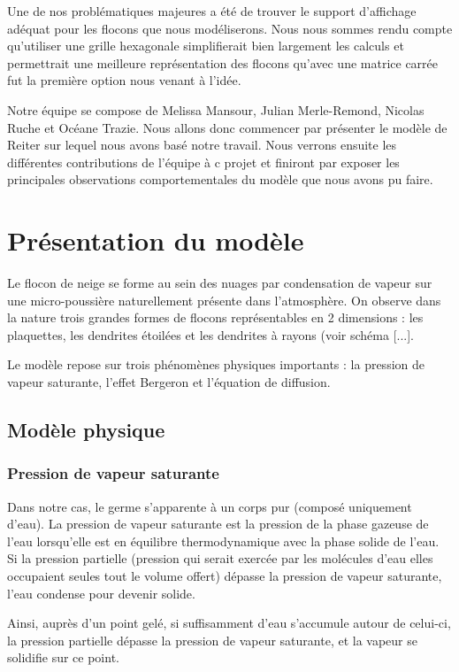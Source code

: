 \documentclass[a4paper,12pt,twoside]{report}
\begin{document}
Une de nos problématiques majeures a été de trouver le support d’affichage adéquat pour les flocons que nous modéliserons. Nous nous sommes rendu compte qu’utiliser une grille hexagonale simplifierait bien largement les calculs et permettrait une meilleure représentation des flocons qu’avec une matrice carrée fut la première option nous venant à l’idée.

Notre équipe se compose de Melissa Mansour, Julian Merle-Remond, Nicolas Ruche et Océane Trazie.
\medbreak
Nous allons donc commencer par présenter le modèle de Reiter sur lequel nous avons basé notre travail. Nous verrons ensuite les différentes contributions de l’équipe à c projet et finiront par exposer les principales observations comportementales du modèle que nous avons pu faire.

\chapter{Présentation du modèle}Le flocon de neige se forme au sein des nuages par condensation de vapeur sur une micro-poussière naturellement présente dans l’atmosphère. On observe dans la nature trois grandes formes de flocons représentables en 2 dimensions : les plaquettes, les dendrites étoilées et les dendrites à rayons (voir schéma [...].

Le modèle repose sur trois phénomènes physiques importants  : la pression de vapeur saturante, l’effet Bergeron et l’équation de diffusion.
 
\section{Modèle physique}
\subsection{Pression de vapeur saturante}Dans notre cas, le germe s’apparente à un corps pur (composé uniquement d’eau).
\medbreak
La pression de vapeur saturante est la pression de la phase gazeuse de l’eau lorsqu’elle est en équilibre thermodynamique avec la phase solide de l’eau. Si la pression partielle (pression qui serait exercée par les molécules d’eau elles occupaient seules tout le volume offert) dépasse la pression de vapeur saturante, l’eau condense pour devenir solide.

Ainsi, auprès d’un point gelé, si suffisamment d’eau s’accumule autour de celui-ci, la pression partielle dépasse la pression de vapeur saturante, et la vapeur se solidifie sur ce point.
\end{document}
